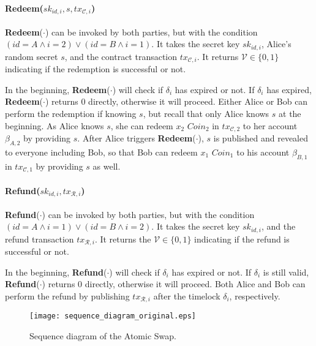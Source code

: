 \paragraph{\textbf{Redeem}($sk_{id, i}, s, tx_{\mathcal{C}, i}$)}
\textbf{Redeem}($\cdot$) can be invoked by both parties, but with the condition $(id = A \wedge i = 2) \vee (id = B \wedge i = 1)$.
It takes the secret key $sk_{id, i}$,
Alice's random secret $s$,
and the contract transaction $tx_{\mathcal{C}, i}$.
It returns $\mathcal{V} \in \{0, 1\}$ indicating if the redemption is successful or not.

In the beginning, \textbf{Redeem}($\cdot$) will check if $\delta_i$ has expired or not. If $\delta_i$ has expired, \textbf{Redeem}($\cdot$) returns $0$ directly, otherwise it will proceed.
Either Alice or Bob can perform the redemption if knowing $s$, but recall that only Alice knows $s$ at the beginning.
As Alice knows $s$, she can redeem $x_2$ $Coin_2$ in $tx_{\mathcal{C}, 2}$ to her account $\beta_{A, 2}$ by providing $s$.
After Alice triggers \textbf{Redeem}($\cdot$), $s$ is published and revealed to everyone including Bob, so that Bob can redeem $x_1$ $Coin_1$ to his account $\beta_{B, 1}$ in $tx_{\mathcal{C}, 1}$ by providing $s$ as well.

\paragraph{\textbf{Refund}($sk_{id, i}, tx_{\mathcal{R}, i}$)}
\textbf{Refund}($\cdot$) can be invoked by both parties, but with the condition $(id = A \wedge i = 1) \vee (id = B \wedge i = 2)$.
It takes the secret key $sk_{id, i}$,
and the refund transaction $tx_{\mathcal{R}, i}$.
It returns the $\mathcal{V} \in \{0, 1\}$ indicating if the refund is successful or not.

In the beginning, \textbf{Refund}($\cdot$) will check if $\delta_i$ has expired or not. If $\delta_i$ is still valid, \textbf{Refund}($\cdot$) returns $0$ directly, otherwise it will proceed.
Both Alice and Bob can perform the refund by publishing $tx_{\mathcal{R}, i}$ after the timelock $\delta_i$, respectively.



\begin{figure}
    \texttt{[image: sequence\_diagram\_original.eps]}
    \caption{Sequence diagram of the Atomic Swap.}
    \label{fig:sequence_diagram_original}
\end{figure}

